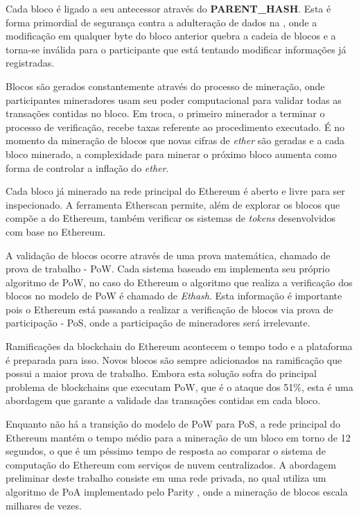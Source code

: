 \documentclass[tcc,capa]{texufpel}
\begin{document}
	Cada bloco é ligado a seu antecessor através do \textbf{PARENT\_HASH}. Esta é forma primordial de segurança contra a adulteração de dados na \bchain, onde a modificação em qualquer byte do bloco anterior quebra a cadeia de blocos e a \bchain torna-se inválida para o participante que está tentando modificar informações já registradas.
	
	Blocos são gerados constantemente através do processo de mineração, onde participantes mineradores usam seu poder computacional para validar todas as transações contidas no bloco. Em troca, o primeiro minerador a terminar o processo de verificação, recebe taxas referente ao procedimento executado. É no momento da mineração de blocos que novas cifras de \textit{ether} são geradas e a cada bloco minerado, a complexidade para minerar o próximo bloco aumenta como forma de controlar a inflação do \textit{ether}.
	
	Cada bloco já minerado na rede principal do Ethereum é aberto e livre para ser inspecionado. A ferramenta Etherscan \cite{team2017etherscan} permite, além de explorar os blocos que compõe a \bchain do Ethereum, também verificar os sistemas de \textit{tokens} desenvolvidos com base no Ethereum.
	
	A validação de blocos ocorre através de uma prova matemática, chamado de prova de trabalho - PoW. Cada sistema baseado em \bchain implementa seu próprio algoritmo de PoW, no caso do Ethereum o algoritmo que realiza a verificação dos blocos no modelo de PoW é chamado de \textit{Ethash}. Esta informação é importante pois o Ethereum está passando a realizar a verificação de blocos via prova de participação - PoS, onde a participação de mineradores será irrelevante.
	
	Ramificações da blockchain do Ethereum acontecem o tempo todo e a plataforma é preparada para isso. Novos blocos são sempre adicionados na ramificação que possui a maior prova de trabalho. Embora esta solução sofra do principal problema de blockchains que executam PoW, que é o ataque dos 51\%, esta é uma abordagem que garante a validade das transações contidas em cada bloco.
	
	Enquanto não há a transição do modelo de PoW para PoS, a rede principal do Ethereum mantém o tempo médio para a mineração de um bloco em torno de 12 segundos, o que é um péssimo tempo de resposta ao comparar o sistema de computação do Ethereum com serviços de nuvem centralizados. A abordagem preliminar deste trabalho consiste em uma rede privada, no qual utiliza um algoritmo de PoA implementado pelo Parity \cite{parity2018wiki}, onde a mineração de blocos escala milhares de vezes.
\end{document}
